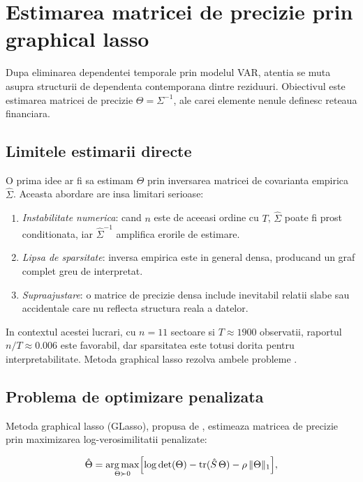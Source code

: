 \chapter{Estimarea matricei de precizie prin graphical lasso}

Dupa eliminarea dependentei temporale prin modelul VAR, atentia se muta asupra
structurii de dependenta contemporana dintre reziduuri. Obiectivul este estimarea
matricei de precizie $\Theta = \Sigma^{-1}$, ale carei elemente nenule definesc
reteaua financiara.

\section{Limitele estimarii directe}

O prima idee ar fi sa estimam $\Theta$ prin inversarea matricei de covarianta
empirica $\hat{\Sigma}$. Aceasta abordare are insa limitari serioase:

\begin{enumerate}
    \item \textit{Instabilitate numerica}: cand $n$ este de aceeasi ordine cu
    $T$, $\hat{\Sigma}$ poate fi prost conditionata, iar $\hat{\Sigma}^{-1}$
    amplifica erorile de estimare.
    \item \textit{Lipsa de sparsitate}: inversa empirica este in general densa,
    producand un graf complet greu de interpretat.
    \item \textit{Supraajustare}: o matrice de precizie densa include inevitabil
    relatii slabe sau accidentale care nu reflecta structura reala a datelor.
\end{enumerate}

In contextul acestei lucrari, cu $n = 11$ sectoare si $T \approx 1900$ observatii,
raportul $n/T \approx 0.006$ este favorabil, dar sparsitatea este totusi
dorita pentru interpretabilitate. Metoda graphical lasso rezolva ambele probleme \citep{friedman2008}.

\section{Problema de optimizare penalizata}

Metoda graphical lasso (GLasso), propusa de \citep{friedman2008}, estimeaza
matricea de precizie prin maximizarea log-verosimilitatii penalizate:

\begin{equation}
    \hat{\Theta} = \underset{\Theta \succ 0}{\arg\max}
    \Bigl[\log\det(\Theta) - \operatorname{tr}(\hat{S}\,\Theta)
    - \rho\,\|\Theta\|_1\Bigr],
    \label{eq:glasso}
\end{equation}

